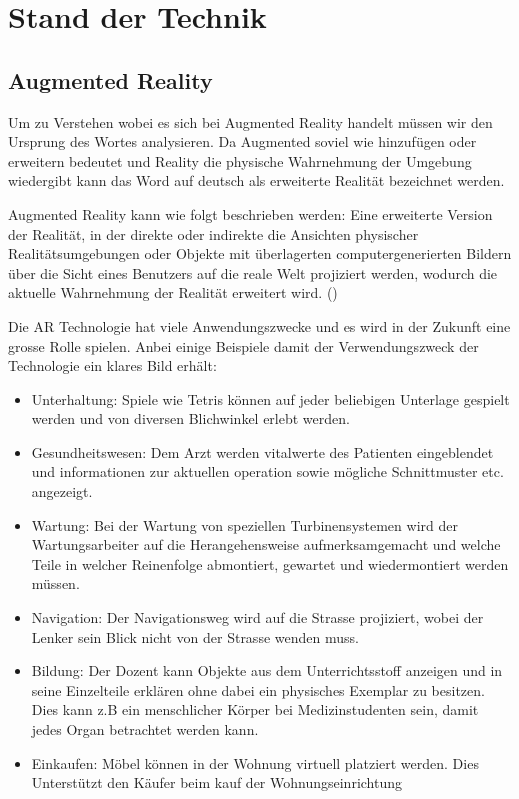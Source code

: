 \section{Stand der Technik}

\subsection{Augmented Reality} \label{sub:augmented-reality}
Um zu Verstehen wobei es sich bei Augmented Reality handelt müssen wir den Ursprung des Wortes analysieren. Da Augmented soviel wie hinzufügen oder erweitern bedeutet und Reality die physische Wahrnehmung der Umgebung wiedergibt kann das Word auf deutsch als erweiterte Realität bezeichnet werden.

Augmented Reality kann wie folgt beschrieben werden: Eine erweiterte Version der Realität, in der direkte oder indirekte die Ansichten physischer Realitätsumgebungen oder Objekte mit überlagerten computergenerierten Bildern über die Sicht eines Benutzers auf die reale Welt projiziert werden, wodurch die aktuelle Wahrnehmung der Realität erweitert wird. (\cite{reality-technologies})

Die AR Technologie hat viele Anwendungszwecke und es wird in der Zukunft eine grosse Rolle spielen. Anbei einige Beispiele damit der Verwendungszweck der Technologie ein klares Bild erhält:
\begin{itemize}
    \item Unterhaltung: Spiele wie Tetris können auf jeder beliebigen Unterlage gespielt werden und von diversen Blichwinkel erlebt werden.
    \item Gesundheitswesen: Dem Arzt werden vitalwerte des Patienten eingeblendet und informationen zur aktuellen operation sowie mögliche Schnittmuster etc. angezeigt.
    \item Wartung: Bei der Wartung von speziellen Turbinensystemen wird der Wartungsarbeiter auf die Herangehensweise aufmerksamgemacht und welche Teile in welcher Reinenfolge abmontiert, gewartet und wiedermontiert werden müssen.
    \item Navigation: Der Navigationsweg wird auf die Strasse projiziert, wobei der Lenker sein Blick nicht von der Strasse wenden muss.
    \item Bildung: Der Dozent kann Objekte aus dem Unterrichtsstoff anzeigen und in seine Einzelteile erklären ohne dabei ein physisches Exemplar zu besitzen. Dies kann z.B ein menschlicher Körper bei Medizinstudenten sein, damit jedes Organ betrachtet werden kann.
    \item Einkaufen: Möbel können in der Wohnung virtuell platziert werden. Dies Unterstützt den Käufer beim kauf der Wohnungseinrichtung
\end{itemize}


